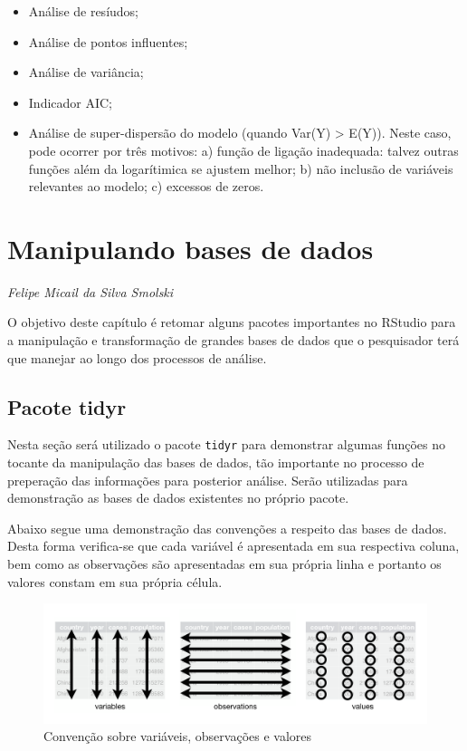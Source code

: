 \documentclass[12pt,brazil,oneside]{book}
\providecommand{\tightlist}{%
  \setlength{\itemsep}{0pt}\setlength{\parskip}{0pt}}
\begin{document}
\begin{itemize}
\tightlist
\item
  Análise de resíudos;
\item
  Análise de pontos influentes;
\item
  Análise de variância;
\item
  Indicador AIC;
\item
  Análise de super-dispersão do modelo (quando Var(Y) \textgreater{} E(Y)). Neste caso, pode ocorrer por três motivos: a) função de ligação inadequada: talvez outras funções além da logarítimica se ajustem melhor; b) não inclusão de variáveis relevantes ao modelo; c) excessos de zeros.
\end{itemize}

\hypertarget{manipulando-bases-de-dados}{%
\chapter{Manipulando bases de dados}\label{manipulando-bases-de-dados}}

\emph{Felipe Micail da Silva Smolski}

\begin{flushright}
\emph{}
\end{flushright}

O objetivo deste capítulo é retomar alguns pacotes importantes no RStudio para a
manipulação e transformação de grandes bases de dados que o pesquisador terá que manejar ao longo dos processos de análise.

\hypertarget{pacote-tidyr}{%
\section{Pacote tidyr}\label{pacote-tidyr}}

Nesta seção será utilizado o pacote \texttt{tidyr} para demonstrar algumas funções no tocante da manipulação das bases de dados, tão importante no processo de preperação das informações para posterior análise. Serão utilizadas para demonstração as bases de dados existentes no próprio pacote.

Abaixo segue uma demonstração das convenções a respeito das bases de dados. Desta forma verifica-se que cada variável é apresentada em sua respectiva coluna, bem como as observações são apresentadas em sua própria linha e portanto os valores constam em sua própria célula.

\begin{figure}[H]

{\centering \includegraphics[width=0.8\linewidth]{tidy-1} 

}

\caption{Convenção sobre variáveis, observações e valores}\label{fig:dados}
\end{figure}
\end{document}
